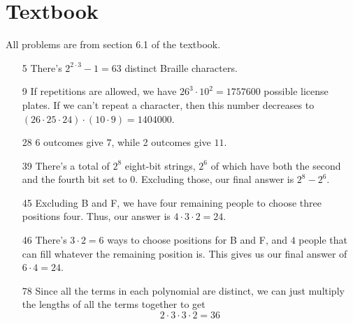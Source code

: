 \documentclass[12pt]{article}
\begin{document}
\section{Textbook}\label{sec:textbook}

All problems are from section 6.1 of the textbook.

\begin{enumerate}
      \item[5] There's $2^{2 \cdot 3}-1=\boxed{63}$ distinct Braille characters.
      \item[9] If repetitions are allowed, we have $26^3 \cdot 10^2=\boxed{1757600}$ possible license plates.
            If we can't repeat a character, then this number decreases to
            $(26 \cdot 25 \cdot 24) \cdot (10 \cdot 9)=\boxed{1404000}$.
      \item[28] 6 outcomes give $7$, while 2 outcomes give $11$.
      \item[39] There's a total of $2^8$ eight-bit strings, $2^6$ of which
            have both the second and the fourth bit set to $0$.
            Excluding those, our final answer is $\boxed{2^8-2^6}$.
      \item[45] Excluding B and F, we have four remaining people to choose three positions four.
            Thus, our answer is $4 \cdot 3 \cdot 2=\boxed{24}$.
      \item[46] There's $3 \cdot 2=6$ ways to choose positions for B and F, and $4$ people that can fill
            whatever the remaining position is.
            This gives us our final answer of $6 \cdot 4 = \boxed{24}$.
      \item[78] Since all the terms in each polynomial are distinct, we can just multiply
            the lengths of all the terms together to get
            \[2 \cdot 3 \cdot 3 \cdot 2=\boxed{36}\]
\end{enumerate}

\pagebreak
\end{document}
